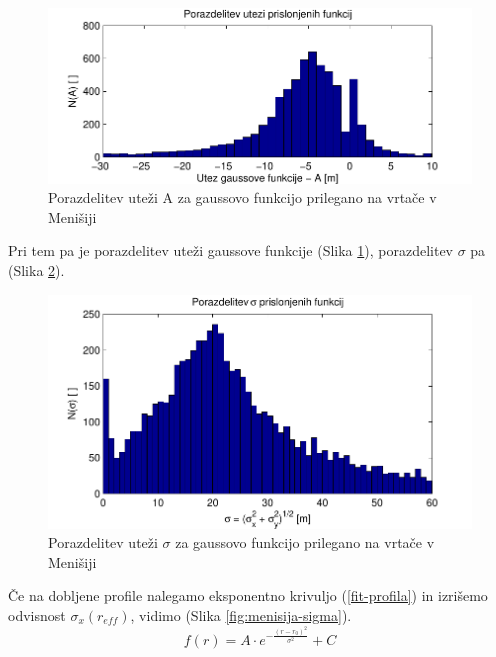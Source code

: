 \documentclass[a4paper, twoside, 12pt]{book}
\begin{document}
        \begin{figure}[h!]
          \begin{center}
            \includegraphics[width=12cm]{slike/menisija-globine-hist}
          \end{center}
          \caption{Porazdelitev uteži A za gaussovo funkcijo prilegano na vrtače v Menišiji}
          \label{fig:menisija-globine-hist}
        \end{figure}

        Pri tem pa je porazdelitev uteži gaussove funkcije (Slika \ref{fig:menisija-globine-hist}), porazdelitev $\sigma$ pa (Slika \ref{fig:menisija-sigme-hist}).

        \begin{figure}[h]
          \begin{center}
            \includegraphics[width=12cm]{slike/menisija-sigme-hist}
          \end{center}
          \caption{Porazdelitev uteži $\sigma$ za gaussovo funkcijo prilegano na vrtače v Menišiji}
          \label{fig:menisija-sigme-hist}
        \end{figure}

        Če na dobljene profile nalegamo eksponentno krivuljo (\ref{fit-profila}) in izrišemo odvisnost $\sigma_x (r_{eff})$, vidimo (Slika \ref{fig:menisija-sigma}).
        \begin{equation}
          f(r) = A \cdot e^{-\frac{(r-r_0)^2}{\sigma^2}} + C  
          \label{fit-profila}
        \end{equation}
\end{document}

